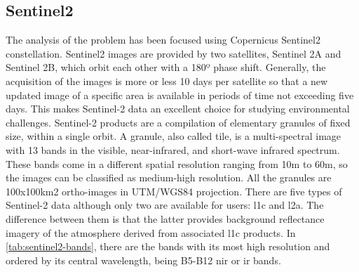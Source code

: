 \documentclass[../main.tex]{subfiles}
\begin{document}
	\subsection{Sentinel2}
The analysis of the problem has been focused using Copernicus Sentinel2 constellation. 
Sentinel2 images are provided by two satellites, Sentinel 2A and Sentinel 2B, which orbit each other with a 180º phase shift. Generally, the acquisition of the images is more or less 10 days per satellite so that a new updated image of a specific area is available in periods of time not exceeding five days. This makes Sentinel-2 data an excellent choice for studying environmental challenges. Sentinel-2 products are a compilation of elementary granules of fixed size, within a single orbit. A granule, also called tile, is a multi-spectral image with 13 bands in the visible, near-infrared, and short-wave infrared spectrum. These bands come in a different spatial resolution ranging from 10m to 60m, so the images can be classified as medium-high resolution. All the granules are 100x100km2 ortho-images in UTM/WGS84 projection. There are five types of Sentinel-2 data although only two are available for users: \gls{l1c} and \gls{l2a}. The difference between them is that the latter provides background reflectance imagery of the atmosphere derived from associated \gls{l1c} products. In \ref{tab:sentinel2-bands}, there are the bands with its most high resolution and ordered by its central wavelength, being B5-B12 \gls{nir} or \gls{ir} bands.
\end{document}
